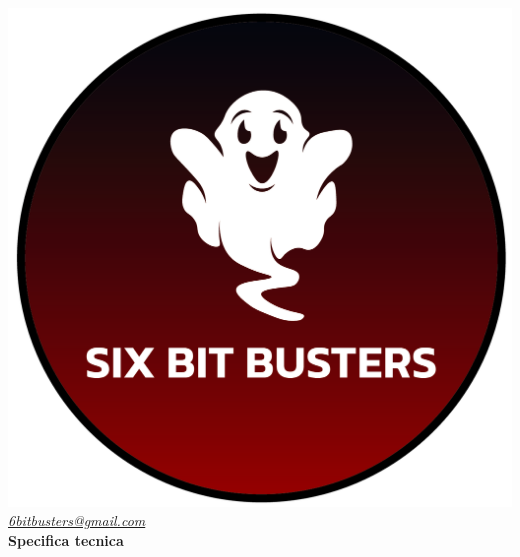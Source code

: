 \thispagestyle{empty}
\renewcommand{\arraystretch}{1.3}


\begin{titlepage}
	\begin{center}
		
	\includegraphics[scale = 0.6]{template/images/logo-circle.png}
	\\[0.8cm]
	\href{mailto:6bitbusters@gmail.com}		      	
	{\large{\textit{6bitbusters@gmail.com} } }\\[0.8cm]
	
	\Huge \textbf{Specifica tecnica} \\[0.5cm]


\end{center}
\end{titlepage}

